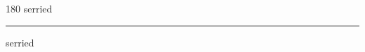 
\begin{frame}
\begin{center}
\begin{turn}{180}
{\fontsize{2.5cm}{1em}\selectfont serried}
\end{turn}
\vspace{1em}\par  
\hrule
\vspace{1em}\par  
{\fontsize{2.5cm}{1em}\selectfont serried}
\end{center}
\end{frame}
